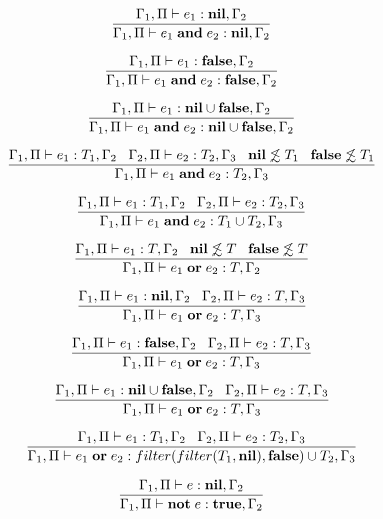 \[
\dfrac{\Gamma_{1}, \Pi \vdash e_{1}:\mathbf{nil}, \Gamma_{2}}
      {\Gamma_{1}, \Pi \vdash e_{1} \; \mathbf{and} \; e_{2}:\mathbf{nil}, \Gamma_{2}}
\]

\[
\dfrac{\Gamma_{1}, \Pi \vdash e_{1}:\mathbf{false}, \Gamma_{2}}
      {\Gamma_{1}, \Pi \vdash e_{1} \; \mathbf{and} \; e_{2}:\mathbf{false}, \Gamma_{2}}
\]

\[
\dfrac{\Gamma_{1}, \Pi \vdash e_{1}:\mathbf{nil} \cup \mathbf{false}, \Gamma_{2}}
      {\Gamma_{1}, \Pi \vdash e_{1} \; \mathbf{and} \; e_{2}:\mathbf{nil} \cup \mathbf{false}, \Gamma_{2}}
\]

\[
\dfrac{\Gamma_{1}, \Pi \vdash e_{1}:T_{1}, \Gamma_{2} \;\;\;
       \Gamma_{2}, \Pi \vdash e_{2}:T_{2}, \Gamma_{3} \;\;\;
       \mathbf{nil} \not\lesssim T_{1} \;\;\;
       \mathbf{false} \not\lesssim T_{1}}
      {\Gamma_{1}, \Pi \vdash e_{1} \; \mathbf{and} \; e_{2}:T_{2}, \Gamma_{3}}
\]

\[
\dfrac{\Gamma_{1}, \Pi \vdash e_{1}:T_{1}, \Gamma_{2} \;\;\;
       \Gamma_{2}, \Pi \vdash e_{2}:T_{2}, \Gamma_{3}}
      {\Gamma_{1}, \Pi \vdash e_{1} \; \mathbf{and} \; e_{2}:T_{1} \cup T_{2}, \Gamma_{3}}
\]

\[
\dfrac{\Gamma_{1}, \Pi \vdash e_{1}:T, \Gamma_{2} \;\;\;
       \mathbf{nil} \not\lesssim T \;\;\;
       \mathbf{false} \not\lesssim T}
      {\Gamma_{1}, \Pi \vdash e_{1} \; \mathbf{or} \; e_{2}:T, \Gamma_{2}}
\]

\[
\dfrac{\Gamma_{1}, \Pi \vdash e_{1}:\mathbf{nil}, \Gamma_{2} \;\;\;
       \Gamma_{2}, \Pi \vdash e_{2}:T, \Gamma_{3}}
      {\Gamma_{1}, \Pi \vdash e_{1} \; \mathbf{or} \; e_{2}:T, \Gamma_{3}}
\]

\[
\dfrac{\Gamma_{1}, \Pi \vdash e_{1}:\mathbf{false}, \Gamma_{2} \;\;\;
       \Gamma_{2}, \Pi \vdash e_{2}:T, \Gamma_{3}}
      {\Gamma_{1}, \Pi \vdash e_{1} \; \mathbf{or} \; e_{2}:T, \Gamma_{3}}
\]

\[
\dfrac{\Gamma_{1}, \Pi \vdash e_{1}:\mathbf{nil} \cup \mathbf{false}, \Gamma_{2} \;\;\;
       \Gamma_{2}, \Pi \vdash e_{2}:T, \Gamma_{3}}
      {\Gamma_{1}, \Pi \vdash e_{1} \; \mathbf{or} \; e_{2}:T, \Gamma_{3}}
\]

\[
\dfrac{\Gamma_{1}, \Pi \vdash e_{1}:T_{1}, \Gamma_{2} \;\;\;
       \Gamma_{2}, \Pi \vdash e_{2}:T_{2}, \Gamma_{3}}
      {\Gamma_{1}, \Pi \vdash e_{1} \; \mathbf{or} \; e_{2}:filter(filter(T_{1}, \mathbf{nil}), \mathbf{false}) \cup T_{2}, \Gamma_{3}}
\]

\[
\dfrac{\Gamma_{1}, \Pi \vdash e:\mathbf{nil}, \Gamma_{2}}
      {\Gamma_{1}, \Pi \vdash \mathbf{not} \; e:\mathbf{true}, \Gamma_{2}}
\]

